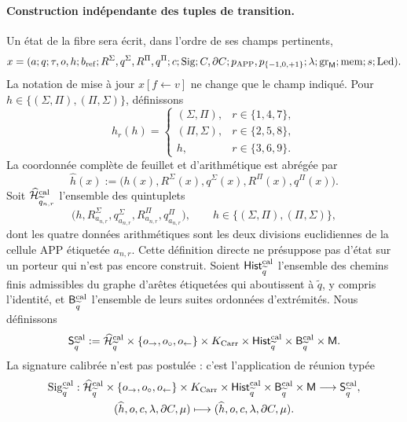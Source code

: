 \paragraph{Construction indépendante des tuples de transition.}
Un état de la fibre sera écrit, dans l’ordre de ses champs pertinents,
\[
 x=(a;q;\tau,o,h;b_{\rm ref};
       R^\Sigma,q^\Sigma,R^\Pi,q^\Pi;c;
       \operatorname{Sig};C,\partial C;p_{\mathrm{APP}},p_{\{-1,0,+1\}};
       \lambda;\operatorname{gr}_{\mathsf M};\operatorname{mem};
       s;\operatorname{Led}).
\]
La notation de mise à jour \(x[f\leftarrow v]\) ne change que le champ
indiqué. Pour \(h\in\{(\Sigma,\Pi),(\Pi,\Sigma)\}\), définissons
\[
 h_r(h)=
 \begin{cases}
  (\Sigma,\Pi),&r\in\{1,4,7\},\\
  (\Pi,\Sigma),&r\in\{2,5,8\},\\
 h,&r\in\{3,6,9\}.
 \end{cases}
\]
La coordonnée complète de feuillet et d’arithmétique est abrégée par
\[
 \widehat h(x):=
 \bigl(h(x),R^\Sigma(x),q^\Sigma(x),R^\Pi(x),q^\Pi(x)\bigr).
\]
Soit \(\widehat{\mathcal H}^{\rm cal}_{\widetilde q_{n,r}}\) l’ensemble des
quintuplets
\[
 \bigl(h,R^\Sigma_{a_{n,r}},q^\Sigma_{a_{n,r}},
          R^\Pi_{a_{n,r}},q^\Pi_{a_{n,r}}\bigr),
 \qquad
 h\in\{(\Sigma,\Pi),(\Pi,\Sigma)\},
\]
dont les quatre données arithmétiques sont les deux divisions euclidiennes de la cellule
APP étiquetée \(a_{n,r}\). Cette définition directe ne présuppose pas d’état
sur un porteur qui n’est pas encore construit. Soient
\(\mathsf{Hist}^{\rm cal}_{\widetilde q}\) l’ensemble des chemins finis
admissibles du graphe d’arêtes étiquetées qui aboutissent à
\(\widetilde q\), y compris l’identité, et
\(\mathsf B^{\rm cal}_{\widetilde q}\) l’ensemble de leurs suites
ordonnées d’extrémités. Nous définissons
\[
 \mathsf S^{\rm cal}_{\widetilde q}:=
 \widehat{\mathcal H}^{\rm cal}_{\widetilde q}
 \times\{o_{\rightarrow},o_{\circ},o_{\leftarrow}\}
 \times K_{\rm Carr}\times
 \mathsf{Hist}^{\rm cal}_{\widetilde q}\times
 \mathsf B^{\rm cal}_{\widetilde q}\times\mathsf M .
\]
La signature calibrée n’est pas postulée : c’est l’application de réunion typée
\[\begin{gathered}
 \operatorname{Sig}^{\rm cal}_{\widetilde q}:
 \widehat{\mathcal H}^{\rm cal}_{\widetilde q}
 \times\{o_{\rightarrow},o_{\circ},o_{\leftarrow}\}
 \times K_{\rm Carr}\times
 \mathsf{Hist}^{\rm cal}_{\widetilde q}\times
 \mathsf B^{\rm cal}_{\widetilde q}\times\mathsf M
 \longrightarrow\mathsf S^{\rm cal}_{\widetilde q},
\\
 (\widehat h,o,c,\lambda,\partial C,\mu)
 \longmapsto(\widehat h,o,c,\lambda,\partial C,\mu).
\end{gathered}\]
